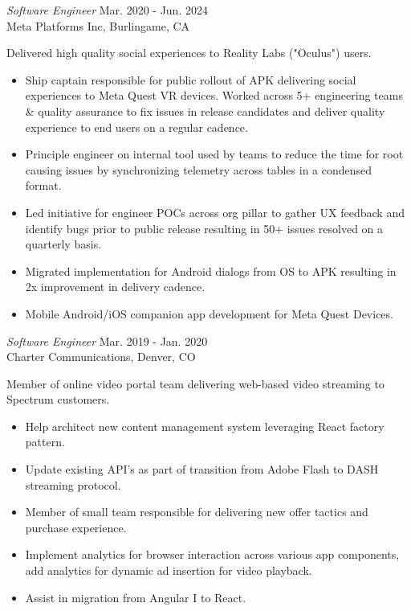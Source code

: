 \documentclass{res}
\begin{document}
\begin{resume}
{\sl Software Engineer} \hfill        Mar. 2020 - Jun. 2024 \\
Meta Platforms Inc, Burlingame, CA
\begin{changemargin}{0.4cm}{0cm} 
Delivered high quality social experiences to Reality Labs ("Oculus") users.
\end{changemargin} 
   \begin{itemize} \itemsep -2pt %
      \item Ship captain responsible for public rollout of APK delivering social experiences to Meta Quest VR devices. Worked across 5+ engineering teams \& quality assurance to fix issues in release candidates and deliver quality experience to end users on a regular cadence.
      \item Principle engineer on internal tool used by teams to reduce the time for root causing issues by synchronizing telemetry across tables in a condensed format.
      \item Led initiative for engineer POCs across org pillar to gather UX feedback and identify bugs prior to public release resulting in 50+ issues resolved on a quarterly basis.
      \item Migrated implementation for Android dialogs from OS to APK resulting in 2x improvement in delivery cadence.
      \item Mobile Android/iOS companion app development for Meta Quest Devices.
   \end{itemize}

{\sl Software Engineer} \hfill        Mar. 2019 - Jan. 2020 \\
Charter Communications, Denver, CO
\begin{changemargin}{0.4cm}{0cm} 
Member of online video portal team delivering web-based video streaming to Spectrum customers.
\end{changemargin} 
   \begin{itemize} \itemsep -2pt %
      \item Help architect new content management system leveraging React factory pattern.
      \item Update existing API's as part of transition from Adobe Flash to DASH streaming protocol.
      \item Member of small team responsible for delivering new offer tactics and purchase experience.
      \item Implement analytics for browser interaction across various app components, add analytics for dynamic ad insertion for video playback.
   \item Assist in migration from Angular I to React.
   \end{itemize}


\end{resume}
\end{document}

